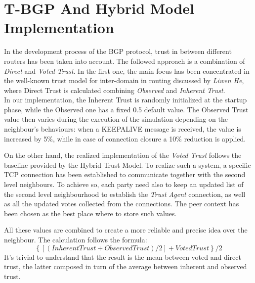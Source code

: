 \section{T-BGP And Hybrid Model Implementation}\label{BGPTrust}
In the development process of the BGP protocol, trust in between different routers has been taken into account. The followed approach is a combination of \textit{Direct} and \textit{Voted Trust}. In the first one, the main focus has been concentrated in the well-known trust model for inter-domain in routing\cite{he2006novel} discussed by \textit{Liwen He}, where Direct Trust is calculated combining \textit{Observed} and \textit{Inherent Trust}.\\
In our implementation, the Inherent Trust is randomly initialized at the startup phase, while the Observed one has a fixed 0.5 default value. The Observed Trust value then varies during the execution of the simulation depending on the neighbour's behaviours: when a KEEPALIVE message is received, the value is increased by 5\%, while in case of connection closure a 10\% reduction is applied.

On the other hand, the realized implementation of the \textit{Voted Trust} follows the baseline provided by the Hybrid Trust Model\cite{rantala2011hybrid}. To realize such a system, a specific TCP connection has been established to communicate together with the second level neighbours. To achieve so, each party need also to keep an updated list of the second level neighbourhood to establish the \textit{Trust Agent} connection, as well as all the updated votes collected from the connections. The peer context has been chosen as the best place where to store such values.

All these values are combined to create a more reliable and precise idea over the neighbour. The calculation follows the formula:
$$ \left\{[(Inherent Trust + Observed Trust) / 2 ] + Voted Trust \right\} / 2 $$
It's trivial to understand that the result is the mean between voted and direct trust, the latter composed in turn of the average between inherent and observed trust.

